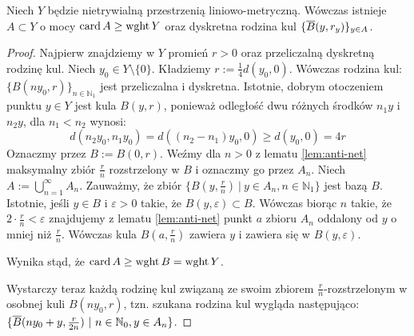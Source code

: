 \begin{lem}
  Niech $Y$ będzie nietrywialną przestrzenią liniowo-metryczną. Wówczas istnieje $A \subset Y$ o mocy $\operatorname{card} A \geq \operatorname{wght} Y$ oraz dyskretna rodzina kul $\{\overline{B}(y, r_y)\}_{y \in A}$.
  
  \begin{proof}
    Najpierw znajdziemy w $Y$ promień $r > 0$ oraz przeliczalną dyskretną rodzinę kul. Niech $y_0 \in Y\setminus\{0\}$. Kładziemy $r := \frac{1}{4} d(y_0,0)$. Wówczas rodzina kul: $\{B(ny_0, r)\}_{n \in \mathbb{N}_1}$ jest przeliczalna i dyskretna. Istotnie, dobrym otoczeniem punktu $y \in Y$ jest kula $B(y,r)$, ponieważ odległość dwu różnych środków $n_1 y$ i $n_2 y$, dla $n_1 < n_2$ wynosi:
    \[
      d(n_2 y_0, n_1 y_0) = d((n_2 - n_1)y_0, 0) \geq d(y_0, 0) = 4r
    \]
    Oznaczmy przez $B := B(0,r)$. Weźmy dla $n > 0$ z lematu \ref{lem:anti-net} maksymalny zbiór $\frac{r}{n}$ rozstrzelony w $B$ i oznaczmy go przez $A_n$. Niech $A := \bigcup_{n=1}^\infty A_n$. Zauważmy, że zbiór $\{B(y, \frac{r}{n})\ |\ y \in A_n, n \in \mathbb{N}_1\}$ jest bazą $B$. Istotnie, jeśli $y \in B$ i $\varepsilon > 0$ takie, że $B(y,\varepsilon) \subset B$. Wówczas biorąc $n$ takie, że $2 \cdot \frac{r}{n} < \varepsilon$ znajdujemy z lematu \ref{lem:anti-net} punkt $a$ zbioru $A_n$ oddalony od $y$ o mniej niż $\frac{r}{n}$. Wówczas kula $B(a, \frac{r}{n})$ zawiera $y$ i zawiera się w $B(y,\varepsilon)$.
    
    Wynika stąd, że $\operatorname{card} A \geq \operatorname{wght} B = \operatorname{wght} Y$.
    
    Wystarczy teraz każdą rodzinę kul związaną ze swoim zbiorem $\frac{r}{n}$-rozstrzelonym w osobnej kuli $B(ny_0, r)$, tzn. szukana rodzina kul wygląda następująco: $\{\overline{B}(ny_0 + y, \frac{r}{2n})\ |\ n \in \mathbb{N}_0, y \in A_n\}$.
  \end{proof}
\end{lem}

